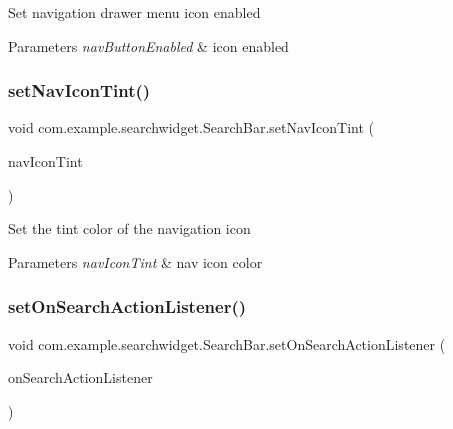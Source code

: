 Set navigation drawer menu icon enabled


\begin{DoxyParams}{Parameters}
{\em nav\+Button\+Enabled} & icon enabled \\
\hline
\end{DoxyParams}
\mbox{\label{classcom_1_1example_1_1searchwidget_1_1_search_bar_a9bfe579751743d32b1008418c6787142}} 
\subsubsection{\texorpdfstring{setNavIconTint()}{setNavIconTint()}}
{\footnotesize\ttfamily void com.\+example.\+searchwidget.\+Search\+Bar.\+set\+Nav\+Icon\+Tint (\begin{DoxyParamCaption}\item[{int}]{nav\+Icon\+Tint }\end{DoxyParamCaption})}

Set the tint color of the navigation icon


\begin{DoxyParams}{Parameters}
{\em nav\+Icon\+Tint} & nav icon color \\
\hline
\end{DoxyParams}
\mbox{\label{classcom_1_1example_1_1searchwidget_1_1_search_bar_a065921f97e1f2d1d3c496a5670482f28}} 
\subsubsection{\texorpdfstring{setOnSearchActionListener()}{setOnSearchActionListener()}}
{\footnotesize\ttfamily void com.\+example.\+searchwidget.\+Search\+Bar.\+set\+On\+Search\+Action\+Listener (\begin{DoxyParamCaption}\item[{\mbox{\hyperlink{interfacecom_1_1example_1_1searchwidget_1_1_search_bar_1_1_on_search_action_listener}{On\+Search\+Action\+Listener}}}]{on\+Search\+Action\+Listener }\end{DoxyParamCaption})}

